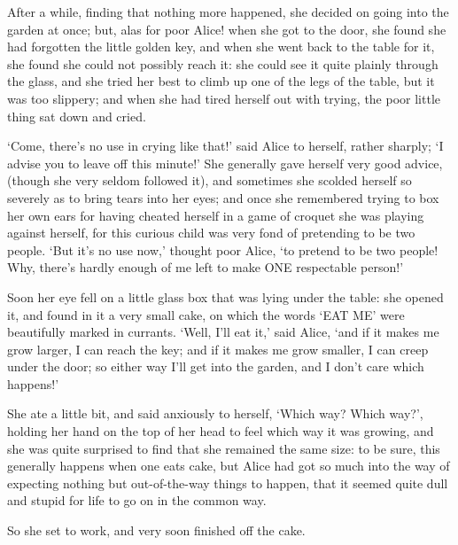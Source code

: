 \documentclass[12pt]{book}
\begin{document}
\begin{Parallel}[p]{}{}
{After a while, finding that nothing more happened, she decided on going into the garden at once; but, alas for poor Alice! when she got to the door, she found she had forgotten the little golden key, and when she went back to the table for it, she found she could not possibly reach it: she could see it quite plainly through the glass, and she tried her best to climb up one of the legs of the table, but it was too slippery; and when she had tired herself out with trying, the poor little thing sat down and cried.

‘Come, there’s no use in crying like that!’ said Alice to herself, rather sharply; ‘I advise you to leave off this minute!’ She generally gave herself very good advice, (though she very seldom followed it), and sometimes she scolded herself so severely as to bring tears into her eyes; and once she remembered trying to box her own ears for having cheated herself in a game of croquet she was playing against herself, for this curious child was very fond of pretending to be two people. ‘But it’s no use now,’ thought poor Alice, ‘to pretend to be two people! Why, there’s hardly enough of me left to make ONE respectable person!’

Soon her eye fell on a little glass box that was lying under the table: she opened it, and found in it a very small cake, on which the words ‘EAT ME’ were beautifully marked in currants. ‘Well, I’ll eat it,’ said Alice, ‘and if it makes me grow larger, I can reach the key; and if it makes me grow smaller, I can creep under the door; so either way I’ll get into the garden, and I don’t care which happens!’

She ate a little bit, and said anxiously to herself, ‘Which way? Which way?’, holding her hand on the top of her head to feel which way it was growing, and she was quite surprised to find that she remained the same size: to be sure, this generally happens when one eats cake, but Alice had got so much into the way of expecting nothing but out-of-the-way things to happen, that it seemed quite dull and stupid for life to go on in the common way.

So she set to work, and very soon finished off the cake.

\begin{center}
\quad*\quad*\quad*\quad*\quad*\quad*\quad*
\par
\quad*\quad*\quad*\quad*\quad*\quad*
\par
\quad*\quad*\quad*\quad*\quad*\quad*\quad*
\end{center}

}
\end{Parallel}
\end{document}
